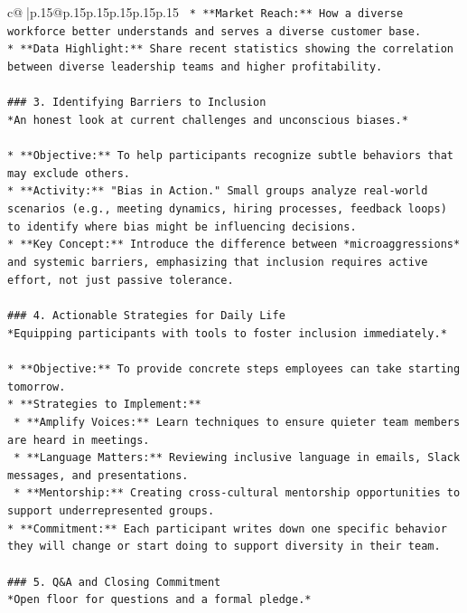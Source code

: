 \documentclass{article}
\begin{document}
{\begin{supertabular}{c@{$\;$}|p{.15\linewidth}@{}p{.15\linewidth}p{.15\linewidth}p{.15\linewidth}p{.15\linewidth}p{.15\linewidth}}
{{{\texttt{    *   **Market Reach:** How a diverse workforce better understands and serves a diverse customer base.} \\
\texttt{*   **Data Highlight:** Share recent statistics showing the correlation between diverse leadership teams and higher profitability.} \\
\\ 
\texttt{\#\#\# 3. Identifying Barriers to Inclusion} \\
\texttt{*An honest look at current challenges and unconscious biases.*} \\
\\ 
\texttt{*   **Objective:** To help participants recognize subtle behaviors that may exclude others.} \\
\texttt{*   **Activity:** "Bias in Action." Small groups analyze real{-}world scenarios (e.g., meeting dynamics, hiring processes, feedback loops) to identify where bias might be influencing decisions.} \\
\texttt{*   **Key Concept:** Introduce the difference between *microaggressions* and systemic barriers, emphasizing that inclusion requires active effort, not just passive tolerance.} \\
\\ 
\texttt{\#\#\# 4. Actionable Strategies for Daily Life} \\
\texttt{*Equipping participants with tools to foster inclusion immediately.*} \\
\\ 
\texttt{*   **Objective:** To provide concrete steps employees can take starting tomorrow.} \\
\texttt{*   **Strategies to Implement:**} \\
\texttt{    *   **Amplify Voices:** Learn techniques to ensure quieter team members are heard in meetings.} \\
\texttt{    *   **Language Matters:** Reviewing inclusive language in emails, Slack messages, and presentations.} \\
\texttt{    *   **Mentorship:** Creating cross{-}cultural mentorship opportunities to support underrepresented groups.} \\
\texttt{*   **Commitment:** Each participant writes down one specific behavior they will change or start doing to support diversity in their team.} \\
\\ 
\texttt{\#\#\# 5. Q\&A and Closing Commitment} \\
\texttt{*Open floor for questions and a formal pledge.*} \\
}}}
\end{supertabular}}
\end{document}
